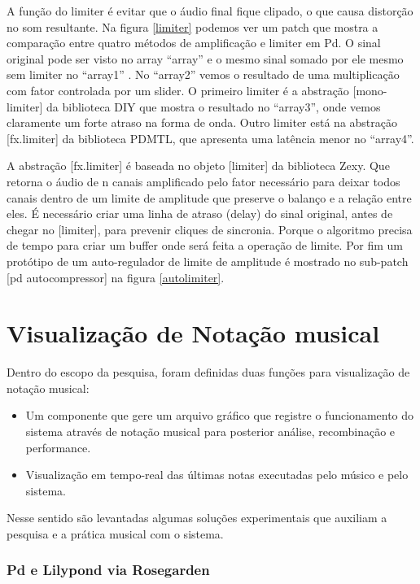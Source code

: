 \documentclass{ppgmus}
\begin{document}
A função do limiter é evitar que o áudio final fique clipado, o que causa distorção no som resultante.
Na figura \ref{limiter} podemos ver um patch que mostra a comparação entre quatro
métodos de amplificação e limiter em Pd. O sinal original pode ser
visto no array ``array'' e o mesmo sinal somado por ele mesmo sem limiter no ``array1'' .
No ``array2'' vemos o resultado de uma multiplicação com fator controlada por
um slider. O primeiro limiter é a abstração [mono-limiter] da biblioteca DIY que mostra
o resultado no ``array3'', onde vemos claramente um forte atraso na 
forma de onda. Outro limiter está na  abstração [fx.limiter\texttildelow] da 
biblioteca PDMTL, que apresenta uma latência menor no ``array4''.

A abstração [fx.limiter\texttildelow] é baseada no objeto [limiter\texttildelow] da biblioteca Zexy.
Que retorna o áudio de n canais amplificado pelo fator necessário para
deixar todos canais dentro de um limite de amplitude que preserve 
o balanço e a relação entre eles. É necessário criar uma linha de atraso
(delay) do sinal original, antes de chegar no [limiter\texttildelow],
para prevenir cliques de sincronia. Porque o algoritmo precisa de
tempo para criar um buffer onde será feita a operação de limite.
Por fim um protótipo de um auto-regulador de limite de amplitude é mostrado
no sub-patch [pd autocompressor] na figura \ref{autolimiter}.


\section{Visualização de Notação musical}
\label{sec-notacao}



Dentro do escopo da pesquisa, foram definidas duas funções
para visualização de notação musical:

\begin{itemize}
 \item Um componente que gere um arquivo gráfico que registre o funcionamento
do sistema através de notação musical para posterior análise, recombinação e performance.
 \item Visualização em tempo-real das últimas notas executadas pelo músico e pelo sistema.
\end{itemize}


Nesse sentido são levantadas algumas soluções experimentais que auxiliam a pesquisa e 
a prática musical com o sistema.




\subsubsection{Pd e Lilypond via Rosegarden}
\end{document}
